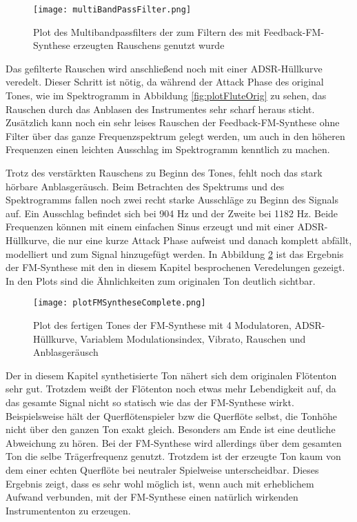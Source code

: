 \begin{figure} [h!t!b!]
\centering
  \texttt{[image: multiBandPassFilter.png]}
\caption{Plot des Multibandpassfilters der zum Filtern des mit Feedback-FM-Synthese erzeugten Rauschens genutzt wurde}
\label{fig:multiBandPassFilter}
\end{figure}

Das gefilterte Rauschen wird anschließend noch mit einer ADSR-Hüllkurve veredelt. Dieser Schritt ist nötig, da während der Attack Phase des original Tones, wie im Spektrogramm in Abbildung \ref{fig:plotFluteOrig} zu sehen, das Rauschen durch das Anblasen des Instrumentes sehr scharf heraus sticht. Zusätzlich kann noch ein sehr leises Rauschen der Feedback-FM-Synthese ohne Filter über das ganze Frequenzspektrum gelegt werden, um auch in den höheren Frequenzen einen leichten Ausschlag im Spektrogramm kenntlich zu machen. 

Trotz des verstärkten Rauschens zu Beginn des Tones, fehlt noch das stark hörbare Anblasgeräusch. Beim Betrachten des Spektrums und des Spektrogramms fallen noch zwei recht starke Ausschläge zu Beginn des Signals auf. Ein Ausschlag befindet sich bei 904 Hz und der Zweite bei 1182 Hz. Beide Frequenzen können mit einem einfachen Sinus erzeugt und mit einer ADSR-Hüllkurve, die nur eine kurze Attack Phase aufweist und danach komplett abfällt, modelliert und zum Signal hinzugefügt werden. In Abbildung \ref{fig:plotFMSyntheseComplete} ist das Ergebnis der FM-Synthese mit den in diesem Kapitel besprochenen Veredelungen gezeigt. In den Plots sind die Ähnlichkeiten zum originalen Ton deutlich sichtbar.

\begin{figure} [h!t!b!]
\centering
  \texttt{[image: plotFMSyntheseComplete.png]}
\caption{Plot des fertigen Tones der FM-Synthese mit 4 Modulatoren, ADSR-Hüllkurve, Variablem Modulationsindex, Vibrato, Rauschen und Anblasgeräusch}
\label{fig:plotFMSyntheseComplete}
\end{figure}

Der in diesem Kapitel synthetisierte Ton nähert sich dem originalen Flötenton sehr gut. Trotzdem weißt der Flötenton noch etwas mehr Lebendigkeit auf, da das gesamte Signal nicht so statisch wie das der FM-Synthese wirkt. Beispielsweise hält der Querflötenspieler bzw die Querflöte selbst, die Tonhöhe nicht über den ganzen Ton exakt gleich. Besonders am Ende ist eine deutliche Abweichung zu hören. Bei der FM-Synthese wird allerdings über dem gesamten Ton die selbe Trägerfrequenz genutzt. Trotzdem ist der erzeugte Ton kaum von dem einer echten Querflöte bei neutraler Spielweise unterscheidbar. Dieses Ergebnis zeigt, dass es sehr wohl möglich ist, wenn auch mit erheblichem Aufwand verbunden, mit der FM-Synthese einen natürlich wirkenden Instrumententon zu erzeugen. 



